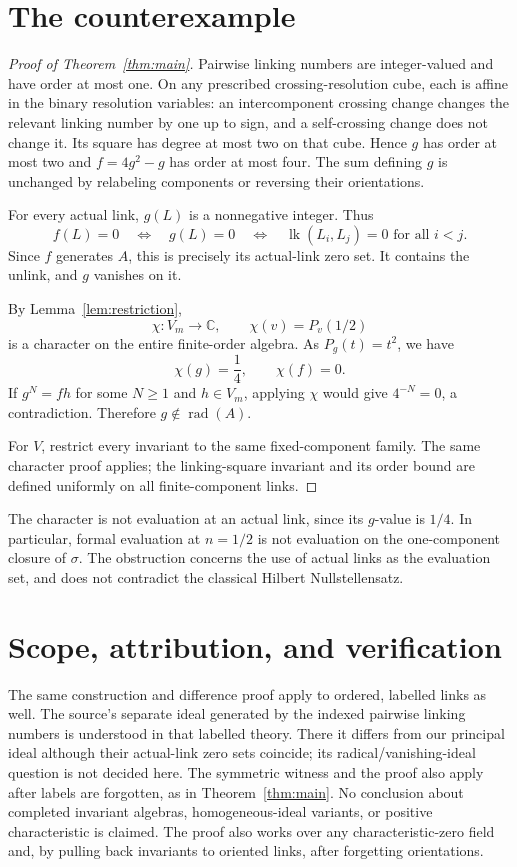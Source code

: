 \documentclass[11pt]{article}
\newcommand{\lk}{\operatorname{lk}}
\newcommand{\rad}{\operatorname{rad}}
\begin{document}
\section{The counterexample}
\begin{proof}[Proof of Theorem~\ref{thm:main}]
Pairwise linking numbers are integer-valued and have order at most one.
On any prescribed crossing-resolution cube, each is affine in the binary
resolution variables: an intercomponent crossing change changes the
relevant linking number by one up to sign, and a self-crossing change
does not change it. Its square has degree at most two on that cube.
Hence \(g\) has order at most two and \(f=4g^2-g\) has order at most four.
The sum defining \(g\) is unchanged by relabeling components or reversing
their orientations.

For every actual link, \(g(L)\) is a nonnegative integer. Thus
\[
 f(L)=0\quad\Longleftrightarrow\quad g(L)=0
 \quad\Longleftrightarrow\quad \lk(L_i,L_j)=0\text{ for all }i<j.
\]
Since \(f\) generates \(A\), this is precisely its actual-link zero set.
It contains the unlink, and \(g\) vanishes on it.

By Lemma~\ref{lem:restriction},
\[
 \chi:V_m\longrightarrow\mathbb C,\qquad \chi(v)=P_v(1/2)
\]
is a character on the entire finite-order algebra.
As \(P_g(t)=t^2\), we have
\[
 \chi(g)=\frac14,\qquad \chi(f)=0.
\]
If \(g^N=fh\) for some \(N\geq1\) and \(h\in V_m\), applying \(\chi\)
would give \(4^{-N}=0\), a contradiction.
Therefore \(g\notin\rad(A)\).

For \(V\), restrict every invariant to the same fixed-component family.
The same character proof applies; the linking-square invariant and its
order bound are defined uniformly on all finite-component links.
\end{proof}

The character is not evaluation at an actual link, since its \(g\)-value
is \(1/4\). In particular, formal evaluation at \(n=1/2\) is not
evaluation on the one-component closure of \(\sigma\).
The obstruction concerns the use of actual links as the evaluation set,
and does not contradict the classical Hilbert Nullstellensatz.

\section{Scope, attribution, and verification}
The same construction and difference proof apply to ordered, labelled
links as well. The source's separate ideal generated by the indexed
pairwise linking numbers is understood in that labelled theory.
There it differs from our principal ideal although their actual-link
zero sets coincide; its radical/vanishing-ideal question is not decided
here. The symmetric witness and the proof also apply after labels are
forgotten, as in Theorem~\ref{thm:main}. No conclusion about completed invariant algebras,
homogeneous-ideal variants, or positive characteristic is claimed.
The proof also works over any characteristic-zero field and, by pulling
back invariants to oriented links, after forgetting orientations.
\end{document}
